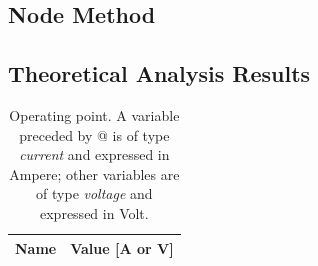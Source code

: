 \subsection{Node Method}
\label{subsec:Node Method}


\subsection{Theoretical Analysis Results}
\begin{table} [H]
  \centering
  \begin{tabular}{|l|r|}
    \hline    
    {\bf Name} & {\bf Value [A or V]} \\ \hline
    
  \end{tabular}
  \caption{Operating point. A variable preceded by @ is of type {\em current}
    and expressed in Ampere; other variables are of type {\it voltage} and expressed in
    Volt.}
  \label{tab:op_analysis}
\end{table}



